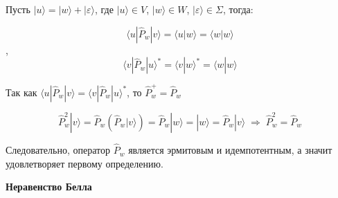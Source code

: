 \documentclass[__main__.tex]{subfiles}
\begin{document}
Пусть $|u\rangle = |w\rangle + |\varepsilon\rangle$, где $|u\rangle \in V$, $|w\rangle \in W$, $|\varepsilon\rangle \in \Sigma$, тогда:

$$\langle u | \hat{P}_w | v \rangle = \langle u | w \rangle = \langle w | w \rangle$$,
$$\langle v | \hat{P}_w | u \rangle^{*} = \langle v | w \rangle^{*} = \langle w | w \rangle$$

Так как $\langle u | \hat{P}_w | v \rangle = \langle v | \hat{P}_w | u \rangle^{*}$, то $\hat{P}^{+}_w = \hat{P}_w$

$$\hat{P}^2_w | v \rangle = \hat{P}_w \left(\hat{P}_w | v \rangle \right) = \hat{P}_w | w \rangle = |w\rangle = \hat{P}_w | v \rangle \; \Rightarrow \; \hat{P}^2_w = \hat{P}_w$$

Следовательно, оператор $\hat{P}_w$ является эрмитовым и идемпотентным, а значит удовлетворяет первому определению. 

\textbf{Неравенство Белла}
\end{document}
